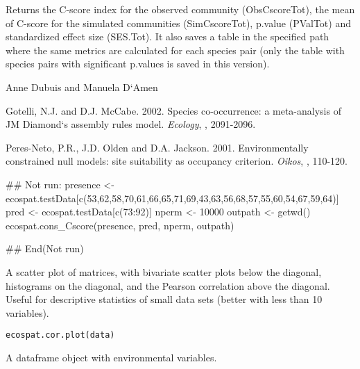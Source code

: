 \documentclass[a4paper]{book}
\begin{document}
%
\begin{Value}
Returns the C-score index for the observed community (ObsCscoreTot), the mean of C-score for the simulated communities (SimCscoreTot), p.value (PValTot) and standardized effect size (SES.Tot). It also saves a table in the specified path where the same 
metrics are calculated for each species pair (only the table with species pairs with significant p.values is saved in this version). 
\end{Value}
%
\begin{Author}\relax
Anne Dubuis  and Manuela D`Amen 
\end{Author}
%
\begin{References}\relax
Gotelli, N.J. and D.J. McCabe. 2002. Species co-occurrence: a meta-analysis of JM Diamond`s assembly rules model. \emph{Ecology}, , 2091-2096.

Peres-Neto, P.R., J.D. Olden and D.A. Jackson. 2001. Environmentally constrained null models: site suitability as occupancy criterion. \emph{Oikos}, , 110-120.

\end{References}
%
\begin{Examples}
\begin{ExampleCode}
## Not run: 
presence <- ecospat.testData[c(53,62,58,70,61,66,65,71,69,43,63,56,68,57,55,60,54,67,59,64)]
pred <- ecospat.testData[c(73:92)]
nperm <- 10000
outpath <- getwd()
ecospat.cons_Cscore(presence, pred, nperm, outpath)

## End(Not run)
\end{ExampleCode}
\end{Examples}
%
\begin{Description}\relax
A scatter plot of matrices, with bivariate scatter plots below the diagonal, histograms on the diagonal, and the Pearson correlation above the diagonal. Useful for descriptive statistics of small data sets (better with less than 10 variables).
\end{Description}
%
\begin{Usage}
\begin{verbatim}
ecospat.cor.plot(data)
\end{verbatim}
\end{Usage}
%
\begin{Arguments}
\begin{ldescription}
\item[\code{data}] A dataframe object with environmental variables.
\end{ldescription}
\end{Arguments}
\end{document}
